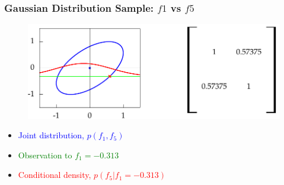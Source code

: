 \documentclass[10pt]{beamer}
\begin{document}
  \begin{frame}[noframenumbering]
    \frametitle{Gaussian Distribution Sample: $f1$ vs $f5$}

    \begin{figure}
      \centering
      \includegraphics[width=\textwidth]{covariance2.png}
    \end{figure}

    \begin{itemize}
      \item \textcolor{blue}{Joint distribution, $p(f_1,f_5)$}
      \item \textcolor{green}{Observation to $f_1 = -0.313$}
      \item \textcolor{red}{Conditional density, $p(f_5|f_1 = -0.313)$}
    \end{itemize}
  \end{frame}
\end{document}
